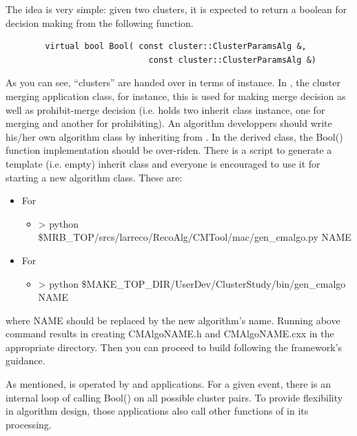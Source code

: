 The idea is very simple: given two clusters, it is expected to return a boolean for decision making from the following function.
\begin{lstlisting}
        virtual bool Bool( const cluster::ClusterParamsAlg &, 
                             const cluster::ClusterParamsAlg &)
\end{lstlisting}
As you can see, ``clusters'' are handed over in terms of {\cpan} instance.
In {\cmerge}, the cluster merging application class, for instance, this is used for making merge decision as well as prohibit-merge decision (i.e. {\cmerge} holds two {\cbalgo} inherit class instance, one for merging and another for prohibiting).
An algorithm developpers should write his/her own {\CPP} algorithm class by inheriting from {\cbalgo}.
In the derived class, the {\ttfamily Bool()} function implementation should be over-riden. 
There is a script to generate a template (i.e. empty) {\cbalgo} inherit class and everyone is encouraged to use it for starting a new algorithm class. These are:
\begin{itemize}
\item For {\larsoft}
\begin{itemize}
        \item[]{\ttfamily> python \$MRB\_TOP/srcs/larreco/RecoAlg/CMTool/mac/gen\_cmalgo.py NAME}
\end{itemize}
\item For {\larlight}
\begin{itemize}
        \item[]{\ttfamily> python \$MAKE\_TOP\_DIR/UserDev/ClusterStudy/bin/gen\_cmalgo NAME}
\end{itemize}
\end{itemize}
where {\ttfamily NAME} should be replaced by the new algorithm's name. 
Running above command results in creating {\ttfamily CMAlgoNAME.h} and {\ttfamily CMAlgoNAME.cxx} in the appropriate directory.
Then you can proceed to build following the framework's guidance.

As mentioned, {\cbalgo} is operated by {\cmerge} and {\cmatch} applications.
For a given event, there is an internal loop of calling {\ttfamily Bool()} on all possible cluster pairs.
To provide flexibility in algorithm design, those applications also call other functions of {\cbalgo} in its processing.

